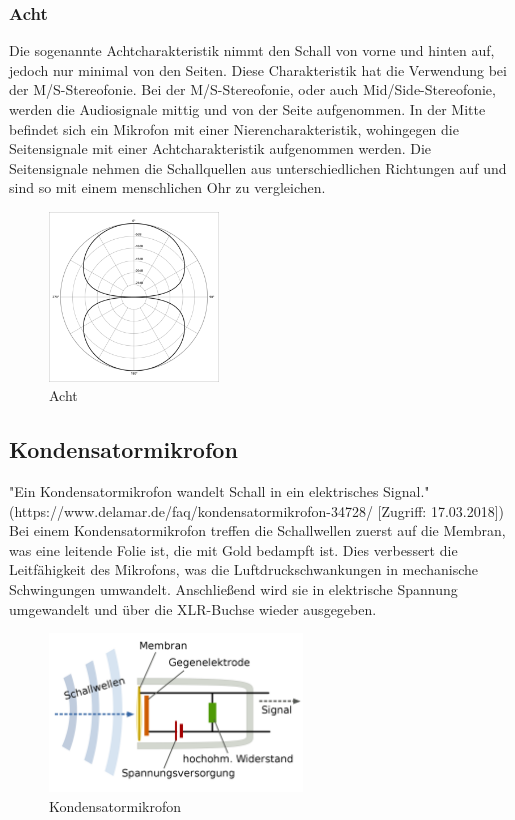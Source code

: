\subsubsection{Acht}
Die sogenannte Achtcharakteristik nimmt den Schall von vorne und hinten auf, jedoch nur minimal von den Seiten. Diese Charakteristik hat die Verwendung bei der M/S-Stereofonie.\citep{kugel}\newline
Bei der M/S-Stereofonie, oder auch Mid/Side-Stereofonie, werden die Audiosignale mittig und von der Seite aufgenommen. In der Mitte befindet sich ein Mikrofon mit einer Nierencharakteristik, wohingegen die Seitensignale mit einer Achtcharakteristik aufgenommen werden. Die Seitensignale nehmen die Schallquellen aus unterschiedlichen Richtungen auf und sind so mit einem menschlichen Ohr zu vergleichen.\citep{ms}
\begin{figure}[H]
	\centering
	\includegraphics[width=0.4\textwidth]{abb7} 
	\caption[Acht]{Acht\footnotemark}
\end{figure}
\subsection{Kondensatormikrofon}
"Ein Kondensatormikrofon wandelt Schall in ein elektrisches Signal." (https://www.delamar.de/faq/kondensatormikrofon-34728/ [Zugriff: 17.03.2018])\newline
Bei einem Kondensatormikrofon treffen die Schallwellen zuerst auf die Membran, was eine leitende Folie ist, die mit Gold bedampft ist. Dies verbessert die  Leitfähigkeit des Mikrofons, was die Luftdruckschwankungen in mechanische Schwingungen umwandelt. Anschließend wird sie in elektrische Spannung umgewandelt und über die XLR-Buchse wieder ausgegeben.\citep{kondensator}
\begin{figure}[H]
	\centering
	\includegraphics[width=0.6\textwidth]{abb8} 
	\caption[Kondensatormikrofon]{Kondensatormikrofon\footnotemark}
\end{figure}
